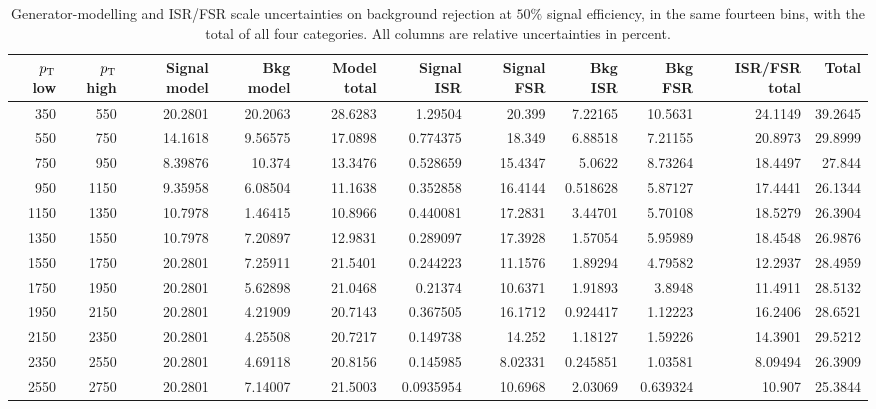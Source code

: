 \begin{landscape}
\begin{table}[p]
\centering
\footnotesize
\setlength{\tabcolsep}{4pt}
\caption{Generator-modelling and ISR/FSR scale uncertainties on background rejection at $50\%$ signal efficiency, in the same fourteen bins, with the total of all four categories. All columns are relative uncertainties in percent.}
\label{tab:supp-syst-modelling}
\begin{tabular}{rr rrr rrrr r r}
\toprule
$p_{\mathrm{T}}$ low & $p_{\mathrm{T}}$ high & Signal model & Bkg model & Model total & Signal ISR & Signal FSR & Bkg ISR & Bkg FSR & ISR/FSR total & Total \\
\midrule
350 & 550 & 20.2801 & 20.2063 & 28.6283 & 1.29504 & 20.399 & 7.22165 & 10.5631 & 24.1149 & 39.2645 \\
550 & 750 & 14.1618 & 9.56575 & 17.0898 & 0.774375 & 18.349 & 6.88518 & 7.21155 & 20.8973 & 29.8999 \\
750 & 950 & 8.39876 & 10.374 & 13.3476 & 0.528659 & 15.4347 & 5.0622 & 8.73264 & 18.4497 & 27.844 \\
950 & 1150 & 9.35958 & 6.08504 & 11.1638 & 0.352858 & 16.4144 & 0.518628 & 5.87127 & 17.4441 & 26.1344 \\
1150 & 1350 & 10.7978 & 1.46415 & 10.8966 & 0.440081 & 17.2831 & 3.44701 & 5.70108 & 18.5279 & 26.3904 \\
1350 & 1550 & 10.7978 & 7.20897 & 12.9831 & 0.289097 & 17.3928 & 1.57054 & 5.95989 & 18.4548 & 26.9876 \\
1550 & 1750 & 20.2801 & 7.25911 & 21.5401 & 0.244223 & 11.1576 & 1.89294 & 4.79582 & 12.2937 & 28.4959 \\
1750 & 1950 & 20.2801 & 5.62898 & 21.0468 & 0.21374 & 10.6371 & 1.91893 & 3.8948 & 11.4911 & 28.5132 \\
1950 & 2150 & 20.2801 & 4.21909 & 20.7143 & 0.367505 & 16.1712 & 0.924417 & 1.12223 & 16.2406 & 28.6521 \\
2150 & 2350 & 20.2801 & 4.25508 & 20.7217 & 0.149738 & 14.252 & 1.18127 & 1.59226 & 14.3901 & 29.5212 \\
2350 & 2550 & 20.2801 & 4.69118 & 20.8156 & 0.145985 & 8.02331 & 0.245851 & 1.03581 & 8.09494 & 26.3909 \\
2550 & 2750 & 20.2801 & 7.14007 & 21.5003 & 0.0935954 & 10.6968 & 2.03069 & 0.639324 & 10.907 & 25.3844 \\

\end{tabular}
\end{table}
\end{landscape}
